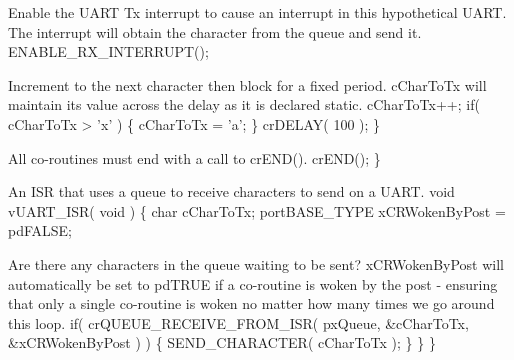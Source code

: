 \begin{DoxyPre}Enable the UART Tx interrupt to cause an interrupt in this
hypothetical UART.  The interrupt will obtain the character
from the queue and send it.
                 ENABLE\_RX\_INTERRUPT();\end{DoxyPre}



\begin{DoxyPre}Increment to the next character then block for a fixed period.
cCharToTx will maintain its value across the delay as it is
declared static.
                 cCharToTx++;
                 if( cCharToTx > 'x' )
                 \{
                        cCharToTx = 'a';
                 \}
                 crDELAY( 100 );
     \}\end{DoxyPre}



\begin{DoxyPre}All co-routines must end with a call to crEND().
     crEND();
 \}\end{DoxyPre}



\begin{DoxyPre}An ISR that uses a queue to receive characters to send on a UART.
 void vUART\_ISR( void )
 \{
 char cCharToTx;
 portBASE\_TYPE xCRWokenByPost = pdFALSE;
\begin{DoxyVerb}while( UART_TX_REG_EMPTY() )
{
\end{DoxyVerb}

Are there any characters in the queue waiting to be sent?
xCRWokenByPost will automatically be set to pdTRUE if a co-routine
is woken by the post - ensuring that only a single co-routine is
woken no matter how many times we go around this loop.
         if( crQUEUE\_RECEIVE\_FROM\_ISR( pxQueue, &cCharToTx, &xCRWokenByPost ) )
                 \{
                         SEND\_CHARACTER( cCharToTx );
                 \}
     \}
 \}\end{DoxyPre}
 